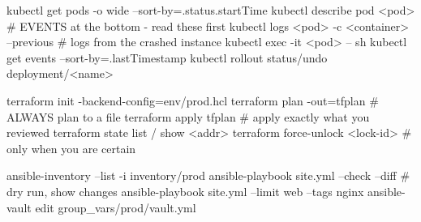 \begin{bashbox}
kubectl get pods -o wide --sort-by=.status.startTime
kubectl describe pod <pod>              # EVENTS at the bottom - read these first
kubectl logs <pod> -c <container> --previous   # logs from the crashed instance
kubectl exec -it <pod> -- sh
kubectl get events --sort-by=.lastTimestamp
kubectl rollout status/undo deployment/<name>
\end{bashbox}

\begin{bashbox}
terraform init -backend-config=env/prod.hcl
terraform plan -out=tfplan              # ALWAYS plan to a file
terraform apply tfplan                  # apply exactly what you reviewed
terraform state list / show <addr>
terraform force-unlock <lock-id>        # only when you are certain
\end{bashbox}

\begin{bashbox}
ansible-inventory --list -i inventory/prod
ansible-playbook site.yml --check --diff   # dry run, show changes
ansible-playbook site.yml --limit web --tags nginx
ansible-vault edit group_vars/prod/vault.yml
\end{bashbox}


